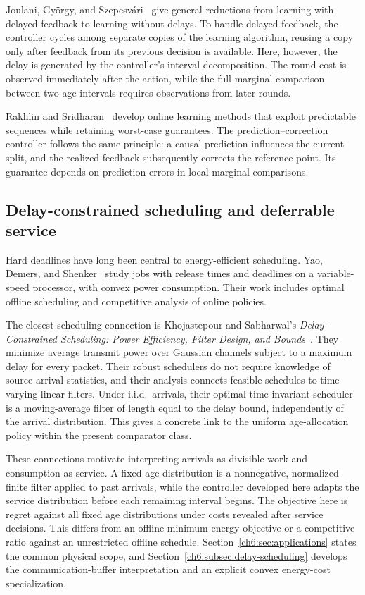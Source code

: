 \documentclass[11pt]{article}
\theoremstyle{plain}
\theoremstyle{remark}
\numberwithin{equation}{section}
\begin{document}
Joulani, Gy\"orgy, and Szepesv\'ari~\cite{joulani2013delayed} give general
reductions from learning with delayed feedback to learning without delays.
To handle delayed feedback, the controller cycles among separate copies of
the learning algorithm, reusing a copy only after feedback from its previous
decision is available. Here, however, the delay is generated by the controller's
interval decomposition. The round cost is observed immediately after the
action, while the full marginal comparison between two age intervals
requires observations from later rounds.

Rakhlin and Sridharan~\cite{RakhlinSridharan2013} develop online learning
methods that exploit predictable sequences while retaining worst-case
guarantees. The prediction--correction controller follows the same
principle: a causal prediction influences the current split, and the
realized feedback subsequently corrects the reference point. Its guarantee
depends on prediction errors in local marginal comparisons.

\subsection{Delay-constrained scheduling and deferrable service}
\label{ch6:subsec:related-scheduling}

Hard deadlines have long been central to energy-efficient scheduling.
Yao, Demers, and Shenker~\cite{yao1995scheduling} study jobs with release
times and deadlines on a variable-speed processor, with convex power
consumption. Their work includes optimal offline scheduling and competitive
analysis of online policies.

The closest scheduling connection is Khojastepour and Sabharwal's
\emph{Delay-Constrained Scheduling: Power Efficiency, Filter Design, and
Bounds}~\cite{khojastepour2004delay}. They minimize average transmit power
over Gaussian channels subject to a maximum delay for every packet. Their
robust schedulers do not require knowledge of source-arrival statistics,
and their analysis connects feasible schedules to time-varying linear
filters. Under i.i.d.\ arrivals, their optimal time-invariant scheduler
is a moving-average filter of length equal to the delay bound,
independently of the arrival distribution. This gives
a concrete link to the uniform age-allocation policy within the present comparator
class.

These connections motivate interpreting arrivals as divisible work and
consumption as service. A fixed age distribution is a nonnegative,
normalized finite filter applied to past arrivals, while the controller
developed here adapts the service distribution before each remaining interval
begins. The objective here is regret against all fixed age distributions
under costs revealed after service decisions. This differs from an offline
minimum-energy objective or a competitive ratio against an unrestricted
offline schedule. Section~\ref{ch6:sec:applications} states the common
physical scope, and Section~\ref{ch6:subsec:delay-scheduling} develops the
communication-buffer interpretation and an explicit convex energy-cost
specialization.
\end{document}
